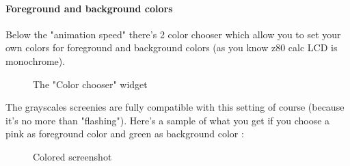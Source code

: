 \documentclass[10pt]{report}
\begin{document}
\paragraph{Foreground and background colors}

Below the "animation speed" there's 2 color chooser which allow you to set your own colors for foreground and background colors (as you know z80 calc LCD is monochrome).\newline

\begin{figure}[H]
\centering
{}
\caption{The "Color chooser" widget}
\end{figure}

The grayscales screenies are fully compatible with this setting of course (because it's no more than "flashing").\newline
Here's a sample of what you get if you choose a pink as foreground color and green as background color :\newline
\begin{figure}[H]
\centering
{}
\caption{Colored screenshot}
\end{figure}
\end{document}
